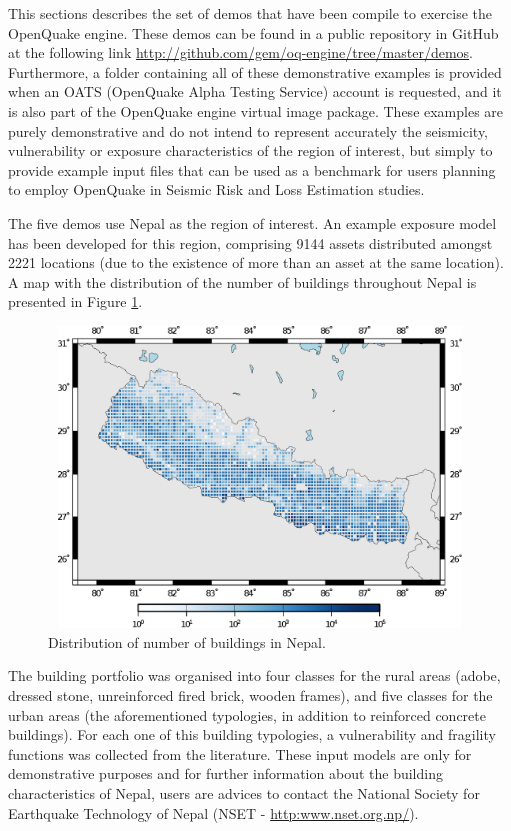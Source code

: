This sections describes the set of demos that have been compile to exercise the OpenQuake engine. These demos can be found in a public repository in GitHub at the following link \href{http://github.com/gem/oq-engine/tree/master/demos}{http://github.com/gem/oq-engine/tree/master/demos}. Furthermore, a folder containing all of these demonstrative examples is provided when an OATS (OpenQuake Alpha Testing Service) account is requested, and it is also part of the OpenQuake engine virtual image package. These examples are purely demonstrative and do not intend to represent accurately the seismicity, vulnerability or exposure characteristics of the region of interest, but simply to provide example input files that can be used as a benchmark for users planning to employ OpenQuake in Seismic Risk and Loss Estimation studies.  

The five demos use Nepal as the region of interest. An example exposure model has been developed for this region, comprising 9144 assets distributed amongst 2221 locations (due to the existence of more than an asset at the same location). A map with the distribution of the number of buildings throughout Nepal is presented in Figure \ref{fig:expNepal}. 

\begin{figure}[ht]
\centering
\includegraphics[width=12cm,height=8cm]{./figures/risk/NepalExposure.eps}
\caption{Distribution of number of buildings in Nepal.}
\label{fig:expNepal}
\end{figure}

The building portfolio was organised into four classes for the rural areas (adobe, dressed stone, unreinforced fired brick, wooden frames), and five classes for the urban areas (the aforementioned typologies, in addition to reinforced concrete buildings). For each one of this building typologies, a vulnerability and fragility functions was collected from the literature. These input models are only for demonstrative purposes and for further information about the building characteristics of Nepal, users are advices to contact the National Society for Earthquake Technology of Nepal (NSET - \href{http://www.nset.org.np/}{http:www.nset.org.np/}).

